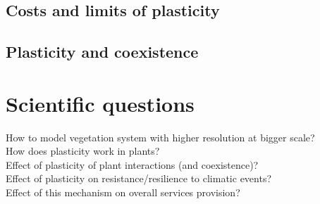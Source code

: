 \section{Costs and limits of plasticity}

\section{Plasticity and coexistence}


\chapter*{Scientific questions}
How to model vegetation system with higher resolution at bigger scale?\\
How does plasticity work in plants?\\
Effect of plasticity of plant interactions (and coexistence)?\\
Effect of plasticity on resistance/resilience to climatic events?\\
Effect of this mechanism on overall services provision?




